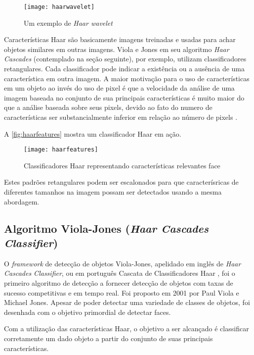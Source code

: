  \begin{figure}[h]
 	\centering
 	\texttt{[image: haarwavelet]}
 	\caption{Um exemplo de \textit{Haar wavelet}}
 	\label{fig:haarwavelet}
 \end{figure}

Características Haar são basicamente imagens treinadas e usadas para achar objetos similares em outras imagens. Viola e Jones em seu algoritmo \textit{Haar Cascades} (contemplado na seção seguinte), por exemplo, utilizam classificadores retangulares. Cada classificador pode indicar a existência ou a ausência de uma característica em outra imagem. A maior motivação para o uso de características em um objeto ao invés do uso de pixel é que a velocidade da análise de uma imagem baseada no conjunto de sua principais características é muito maior do que a análise baseada sobre seus pixels, devido ao fato do numero de características ser substancialmente inferior em relação ao número de pixels \cite{gustavo_cascata}.

A \autoref{fig:haarfeatures} mostra um classificador Haar em ação.

 \begin{figure}[h]
	\centering
	\texttt{[image: haarfeatures]}
	\caption{Classificadores Haar representando características relevantes face}
	\label{fig:haarfeatures}
\end{figure}

Estes padrões retangulares podem ser escalonados para que caracterísricas de diferentes tamanhos na imagem possam ser detectados usando a mesma abordagem.


\subsection{Algoritmo Viola-Jones (\textit{Haar Cascades Classifier}) }\label{subsubsec:violajones}

O \textit{framework} de detecção de objetos Viola-Jones, apelidado em inglês de \textit{Haar Cascades Classifier}, ou em português Cascata de Classificadores Haar \cite{gustavo_cascata}, foi o primeiro algoritmo de detecção a fornecer detecção de objetos com taxas de sucesso competitivas e em tempo real. Foi proposto em 2001 por Paul Viola e Michael Jones. Apesar de poder detectar uma variedade de classes de objetos, foi desenhada com o objetivo primordial de detectar faces.

Com a utilização das características Haar, o objetivo a ser alcançado é classificar corretamente um dado objeto a partir do conjunto de suas principais características. 

